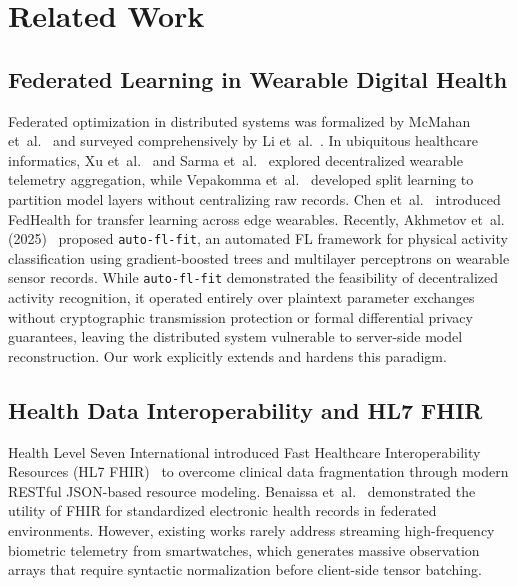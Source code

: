 \documentclass[journal,twocolumn,10pt]{IEEEtran}
\begin{document}
\section{Related Work}
\subsection{Federated Learning in Wearable Digital Health}
Federated optimization in distributed systems was formalized by McMahan et~al.~\cite{mcmahan2017communication} and surveyed comprehensively by Li et~al.~\cite{li2020federated}. In ubiquitous healthcare informatics, Xu et~al.~\cite{xu2021federated} and Sarma et~al.~\cite{sarma2021federated} explored decentralized wearable telemetry aggregation, while Vepakomma et~al.~\cite{vepakomma2018split} developed split learning to partition model layers without centralizing raw records. Chen et~al.~\cite{chen2020fedhealth} introduced FedHealth for transfer learning across edge wearables. Recently, Akhmetov et~al. (2025)~\cite{akhmetov2025auto} proposed \texttt{auto-fl-fit}, an automated FL framework for physical activity classification using gradient-boosted trees and multilayer perceptrons on wearable sensor records. While \texttt{auto-fl-fit} demonstrated the feasibility of decentralized activity recognition, it operated entirely over plaintext parameter exchanges without cryptographic transmission protection or formal differential privacy guarantees, leaving the distributed system vulnerable to server-side model reconstruction. Our work explicitly extends and hardens this paradigm.

\subsection{Health Data Interoperability and HL7 FHIR}
Health Level Seven International introduced Fast Healthcare Interoperability Resources (HL7 FHIR)~\cite{hl7fhir2019} to overcome clinical data fragmentation through modern RESTful JSON-based resource modeling. Benaissa et~al.~\cite{benaissa2021flfhir} demonstrated the utility of FHIR for standardized electronic health records in federated environments. However, existing works rarely address streaming high-frequency biometric telemetry from smartwatches, which generates massive observation arrays that require syntactic normalization before client-side tensor batching.
\end{document}
